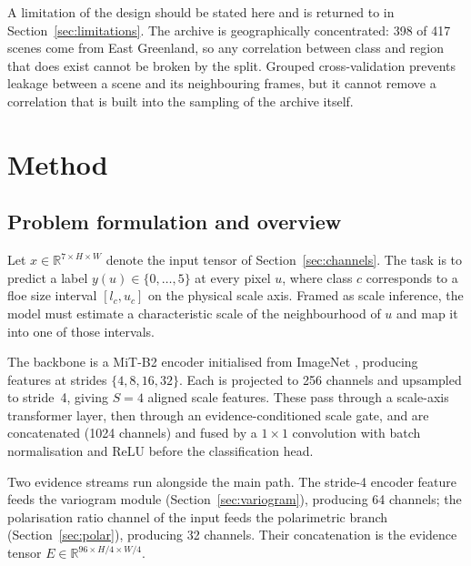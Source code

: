 \documentclass[preprint,12pt,authoryear]{elsarticle}
\begin{document}
A limitation of the design should be stated here and is returned to in
Section~\ref{sec:limitations}. The archive is geographically concentrated: 398
of 417 scenes come from East Greenland, so any correlation between class and
region that does exist cannot be broken by the split. Grouped cross-validation
prevents leakage between a scene and its neighbouring frames, but it cannot
remove a correlation that is built into the sampling of the archive itself.

\section{Method}
\label{sec:method}

\subsection{Problem formulation and overview}

Let $x \in \mathbb{R}^{7 \times H \times W}$ denote the input tensor of
Section~\ref{sec:channels}. The task is to predict a label
$y(u) \in \{0,\dots,5\}$ at every pixel $u$, where class $c$ corresponds to a
floe size interval $[l_c, u_c]$ on the physical scale axis. Framed as scale
inference, the model must estimate a characteristic scale of the neighbourhood
of $u$ and map it into one of those intervals.

The backbone is a MiT-B2 encoder \citep{xie2021segformer} initialised from
ImageNet \citep{deng2009imagenet}, producing features at strides
$\{4, 8, 16, 32\}$. Each is projected to 256 channels and upsampled to stride~4,
giving $S=4$ aligned scale features. These pass through a scale-axis transformer
layer, then through an evidence-conditioned scale gate, and are concatenated
(1024 channels) and fused by a $1\times1$ convolution with batch normalisation
and ReLU before the classification head.

Two evidence streams run alongside the main path. The stride-4 encoder feature
feeds the variogram module (Section~\ref{sec:variogram}), producing 64 channels;
the polarisation ratio channel of the input feeds the polarimetric branch
(Section~\ref{sec:polar}), producing 32 channels. Their concatenation is the
evidence tensor $E \in \mathbb{R}^{96 \times H/4 \times W/4}$.
\end{document}
